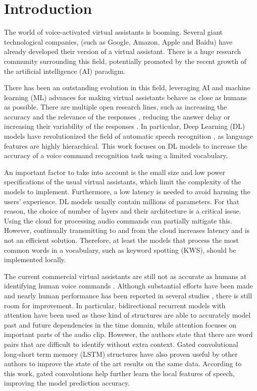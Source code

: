 \documentclass{elsarticle}
\begin{document}
\linenumbers

\section{Introduction}
The world of voice-activated virtual assistants is booming. Several giant technological companies, (such as Google, Amazon, Apple and Baidu) have already developed their version of a virtual assistant. There is a huge research community surrounding this field, potentially promoted by the recent growth of the artificial intelligence (AI) paradigm. 

There has been an outstanding evolution in this field, leveraging AI and machine learning (ML) advances for  making virtual assistants behave as close as humans as possible. There are multiple open research lines, such as increasing the accuracy and the relevance of the responses \cite{milabot2017}, reducing the answer delay \cite{Han2017} or increasing their variability of the responses \cite{Li2017}. In particular, Deep Learning (DL) models have revolutionized the field of automatic speech recognition \cite{Nassif2019}, as language features are highly hierarchical. This work focuses on DL models to increase the accuracy of a voice command recognition task using a limited vocabulary. 

An important factor to take into account is the small size and low power specifications of the usual virtual assistants, which limit the complexity of the models to implement. Furthermore, a low latency is needed to avoid harming the users' experience. DL models usually contain millions of parameters. For that reason, the choice of number of layers and their architecture is a critical issue. Using the cloud for processing audio commands can partially mitigate this. However, continually transmitting to and from the cloud increases latency and is not an efficient solution. Therefore, at least the models that process the most common words in a vocabulary, such as keyword spotting (KWS), should be implemented locally.

The current commercial virtual assistants are still not as accurate as humans at identifying human voice commands \cite{Michaely2017}. Although substantial efforts have been made and nearly human performance has been reported in several studies \cite{Andrade2018, Zhang2017, McMahan2018, Warden2018}, there is still room for improvement. In particular, bidirectional recurrent models with attention have been used  \cite{Andrade2018} as these kind of structures are able to accurately model past and future dependencies in the time domain, while attention focuses on important parts of the audio clip. Howewer, the authors state that there are word pairs that are difficult to identify without extra context. Gated convolutional long-short term memory (LSTM) structures have also proven useful by other authors \cite{Wang2018} to improve the state of the art results on the same data. According to this work, gated convolutions help further learn the local features of speech, improving the model prediction accuracy.
\end{document}
